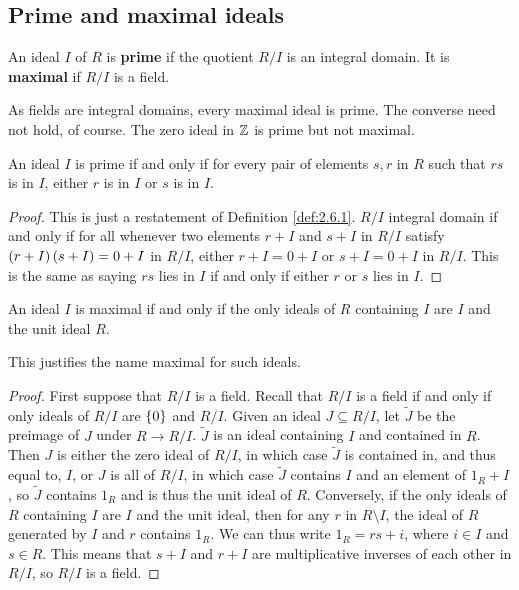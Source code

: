 
\subsection{Prime and maximal ideals}

\begin{definition}
\label{def:2.6.1}
An ideal $ I $ of $ R $ is \textbf{prime} if the quotient $ R / I $ is an integral domain. It is \textbf{maximal} if $ R / I $ is a field.
\end{definition}

\begin{note*}
As fields are integral domains, every maximal ideal is prime. The converse need not hold, of course. The zero ideal in $ \mathbb{Z} $ is prime but not maximal.
\end{note*}

\begin{lemma}
An ideal $ I $ is prime if and only if for every pair of elements $ s, r $ in $ R $ such that $ rs $ is in $ I $, either $ r $ is in $ I $ or $ s $ is in $ I $.
\end{lemma}

\begin{proof}
This is just a restatement of Definition \ref{def:2.6.1}. $ R / I $ integral domain if and only if for all whenever two elements $ r + I $ and $ s + I $ in $ R / I $ satisfy $ \left( r + I \right)\left( s + I \right) = 0 + I $ in $ R / I $, either $ r + I = 0 + I $ or $ s + I = 0 + I $ in $ R / I $. This is the same as saying $ rs $ lies in $ I $ if and only if either $ r $ or $ s $ lies in $ I $.
\end{proof}

\begin{lemma}
An ideal $ I $ is maximal if and only if the only ideals of $ R $ containing $ I $ are $ I $ and the unit ideal $ R $.
\end{lemma}

This justifies the name maximal for such ideals.

\begin{proof}
First suppose that $ R / I $ is a field. Recall that $ R / I $ is a field if and only if only ideals of $ R / I $ are $ \left\{ 0 \right\} $ and $ R / I $. Given an ideal $ J \subseteq R / I $, let $ \widetilde{J} $ be the preimage of $ J $ under $ R \to R / I $. $ \widetilde{J} $ is an ideal containing $ I $ and contained in $ R $. Then $ J $ is either the zero ideal of $ R / I $, in which case $ \widetilde{J} $ is contained in, and thus equal to, $ I $, or $ J $ is all of $ R / I $, in which case $ \widetilde{J} $ contains $ I $ and an element of $ 1_R + I $, so $ \widetilde{J} $ contains $ 1_R $ and is thus the unit ideal of $ R $. Conversely, if the only ideals of $ R $ containing $ I $ are $ I $ and the unit ideal, then for any $ r $ in $ R \setminus I $, the ideal of $ R $ generated by $ I $ and $ r $ contains $ 1_R $. We can thus write $ 1_R = rs + i $, where $ i \in I $ and $ s \in R $. This means that $ s + I $ and $ r + I $ are multiplicative inverses of each other in $ R / I $, so $ R / I $ is a field.
\end{proof}


